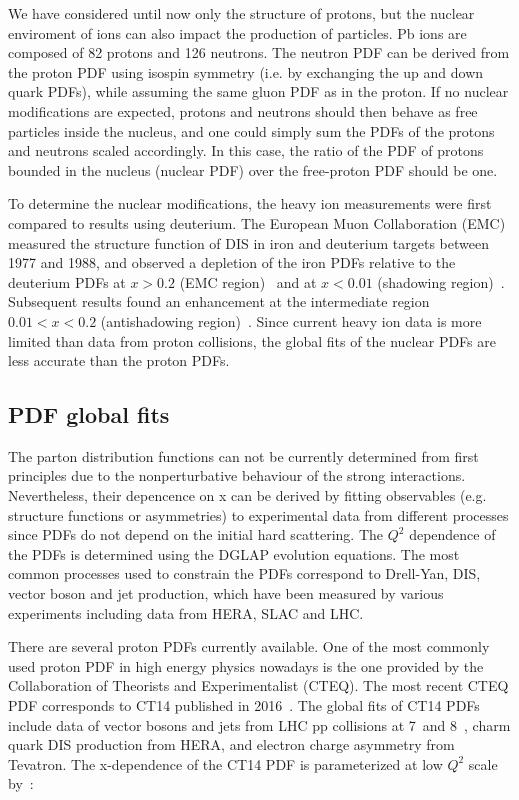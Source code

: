 We have considered until now only the structure of protons, but the nuclear enviroment of ions can also impact the production of particles. Pb ions are composed of 82 protons and 126 neutrons. The neutron PDF can be derived from the proton PDF using isospin symmetry (i.e. by exchanging the up and down quark PDFs), while assuming the same gluon PDF as in the proton. If no nuclear modifications are expected, protons and neutrons should then behave as free particles inside the nucleus, and one could simply sum the PDFs of the protons and neutrons scaled accordingly. In this case, the ratio of the PDF of protons bounded in the nucleus (nuclear PDF) over the free-proton PDF should be one.

To determine the nuclear modifications, the heavy ion measurements were first compared to results using deuterium. The European Muon Collaboration (EMC) measured the structure function of DIS in iron and deuterium targets between 1977 and 1988, and observed a depletion of the iron PDFs relative to the deuterium PDFs at $x>0.2$ (EMC region)~\cite{EMCStrucFunc_1} and at $x<0.01$ (shadowing region)~\cite{EMCStrucFunc_2}. Subsequent results found an enhancement at the intermediate region $0.01 < x < 0.2$ (antishadowing region)~\cite{NMCStrucFunc}. Since current heavy ion data is more limited than data from proton collisions, the global fits of the nuclear PDFs are less accurate than the proton PDFs.

\subsection{PDF global fits}

The parton distribution functions can not be currently determined from first principles due to the nonperturbative behaviour of the strong interactions. Nevertheless, their depencence on x can be derived by fitting observables (e.g. structure functions or asymmetries) to experimental data from different processes since PDFs do not depend on the initial hard scattering. The $Q^{2}$ dependence of the PDFs is determined using the DGLAP evolution equations. The most common processes used to constrain the PDFs correspond to Drell-Yan, DIS, vector boson and jet production, which have been measured by various experiments including data from HERA, SLAC and LHC.

There are several proton PDFs currently available. One of the most commonly used proton PDF in high energy physics nowadays is the one provided by the Collaboration of Theorists and Experimentalist (CTEQ). The most recent CTEQ PDF corresponds to CT14 published in 2016~\cite{CT14}. The global fits of CT14 PDFs include data of vector bosons and jets from LHC pp collisions at 7~\TeV and 8~\TeV, charm quark DIS production from HERA, and electron charge asymmetry from Tevatron. The x-dependence of the CT14 PDF is parameterized at low $Q^{2}$ scale by~\cite{CT14}:

